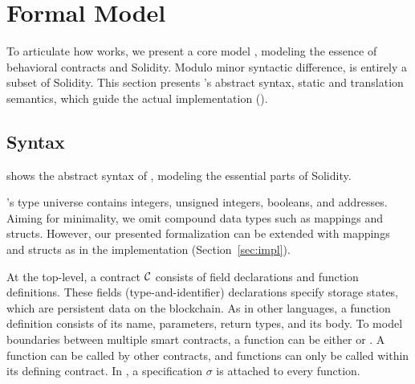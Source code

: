 \section{Formal Model} \label{sec:model}

To articulate how \lang works, we present a core model \corelang,
modeling the essence of behavioral contracts and Solidity.
Modulo minor syntactic difference, \corelang is entirely a subset of Solidity. %
This section presents \corelang's abstract syntax, static and
translation semantics, which guide the actual implementation (). 





\subsection{Syntax}

 shows the abstract syntax of \corelang, modeling the essential parts of Solidity.

\corelang's type universe contains integers, unsigned integers, booleans, and addresses.
Aiming for minimality, we omit compound data types such as mappings and structs.
However, our presented formalization can be extended with mappings and structs as in the implementation (Section~\ref{sec:impl}).

At the top-level, a contract $\mathcal{C}$ consists of field declarations and function definitions.
These fields (type-and-identifier) declarations specify storage states, which are persistent data on the blockchain.
As in other languages, a function definition consists of its name, parameters,
return types, and its body. 
To model boundaries between multiple smart contracts, a function can be either  or .
A  function can be called by other contracts, and  functions 
can only be called within its defining contract.
In \corelang, a specification $\sigma$ is attached to every function.

